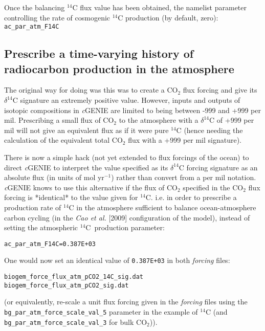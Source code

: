 Once the balancing \(^{14}\)C flux value has been obtained,  the namelist parameter controlling the rate of cosmogenic \(^{14}\)C production (by default, zero): \texttt{ac\_par\_atm\_F14C}

%
\newpage
\subsection*{Prescribe a time-varying history of radiocarbon production in the atmosphere}
\vspace{1mm}

The original way for doing was this was to create a CO\(_{2}\) flux forcing and give its \(\delta^{14}\)C signature an extremely positive value. However, inputs and outputs of isotopic compositions in \textit{c}GENIE are limited to being between -999 and +999 per mil. Prescribing a small flux of CO\(_{2}\) to the atmosphere with a \(\delta^{14}\)C of +999 per mil will not give an equivalent flux as if it were pure \(^{14}\)C (hence needing the calculation of the equivalent total CO\(_{2}\) flux with a +999 per mil signature).

There is now a simple hack (not yet extended to flux forcings of the ocean) to direct \textit{c}GENIE to interpret the value specified as its \(\delta^{14}\)C forcing signature as an absolute flux (in units of mol yr\(^{-1}\)) rather than convert from a per mil notation. \textit{c}GENIE knows to use this alternative if the flux of CO\(_{2}\) specified in the CO\(_{2}\) flux forcing is *identical* to the value given for \(^{14}\)C. i.e. in order to prescribe a production rate of \(^{14}\)C in the atmosphere sufficient to balance ocean-atmosphere carbon cycling (in the \textit{Cao et al.} [2009] configuration of the model), instead of setting the atmospheric \(^{14}\)C\ production parameter:
\vspace{-2mm}\small\begin{verbatim}
ac_par_atm_F14C=0.387E+03
\end{verbatim}\normalsize\vspace{-2mm}

\noindent One would now set an identical value of \texttt{0.387E+03} in both \textit{forcing} files:
\vspace{-2mm}\small\begin{verbatim}
biogem_force_flux_atm_pCO2_14C_sig.dat
biogem_force_flux_atm_pCO2_sig.dat
\end{verbatim}\normalsize\vspace{-2mm}
(or equivalently, re-scale a unit flux forcing given in the \textit{forcing} files using the \texttt{bg\_par\_atm\_force\_scale\_val\_5} parameter in the example of \(^{14}\)C (and \texttt{bg\_par\_atm\_force\_scale\_val\_3} for bulk CO\(_{2}\))).

